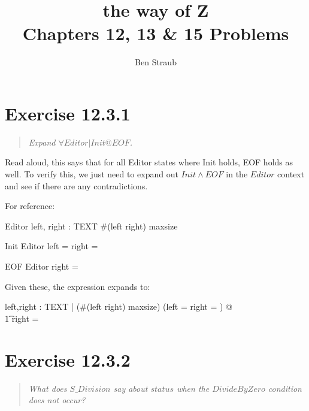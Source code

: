 \documentclass[10pt]{article}
\begin{document}
\title{the way of Z \\ Chapters 12, 13 \& 15 Problems}
\author{Ben Straub}
\maketitle

\section{Exercise 12.3.1}
\begin{quote}
  {\it
    Expand $\forall Editor | Init @ EOF$.
  }
\end{quote}
Read aloud, this says that for all Editor states where Init holds, EOF holds as well. To verify
this, we just need to expand out $Init \land EOF$ in the $Editor$ context and see if there are any
contradictions.

For reference:
\begin{spec}
  \begin{schema}{Editor}
    left, right : TEXT \where \#(left \cat right) \leq maxsize
  \end{schema}
  \begin{schema}{Init}
    Editor \where left = right = \langle \rangle
  \end{schema}
  \begin{schema}{EOF}
    Editor \where right = \langle \rangle
  \end{schema}

  Given these, the expression expands to:

  \begin{zed}
    \forall left,right : TEXT | (\#(left \cat right) \leq maxsize) \land (left = right = \langle \rangle) @ \\
    \t1 right = \langle \rangle
  \end{zed}
\end{spec}



\section{Exercise 12.3.2}
\begin{quote}
  {\it
    What does $S\_Division$ say about $status$ when the $DivideByZero$ condition does not occur?
  }
\end{quote}
\end{document}
